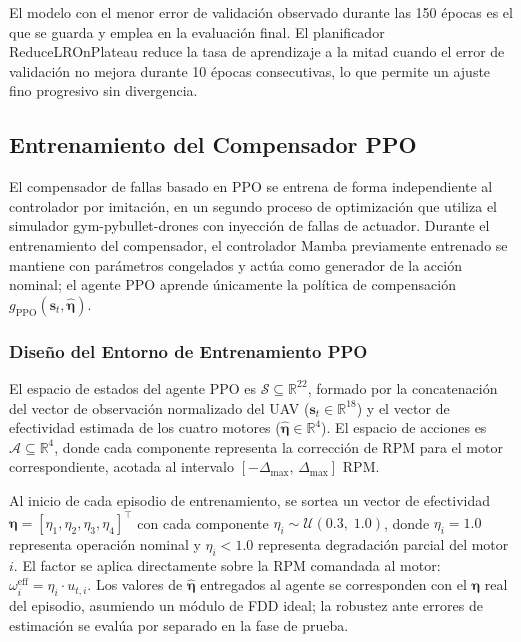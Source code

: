El modelo con el menor error de validación observado durante las 150 épocas es el que se guarda y emplea en la evaluación final. El planificador ReduceLROnPlateau reduce la tasa de aprendizaje a la mitad cuando el error de validación no mejora durante 10 épocas consecutivas, lo que permite un ajuste fino progresivo sin divergencia.


\subsection{Entrenamiento del Compensador PPO}
\label{sec:ppo_train}

El compensador de fallas basado en PPO se entrena de forma independiente al controlador por imitación, en un segundo proceso de optimización que utiliza el simulador gym-pybullet-drones con inyección de fallas de actuador. Durante el entrenamiento del compensador, el controlador Mamba previamente entrenado se mantiene con parámetros congelados y actúa como generador de la acción nominal; el agente PPO aprende únicamente la política de compensación $g_{\text{PPO}}(\mathbf{s}_t, \hat{\boldsymbol{\eta}})$.

\subsubsection{Diseño del Entorno de Entrenamiento PPO}

El espacio de estados del agente PPO es $\mathcal{S} \subseteq \mathbb{R}^{22}$, formado por la concatenación del vector de observación normalizado del UAV ($\mathbf{s}_t \in \mathbb{R}^{18}$) y el vector de efectividad estimada de los cuatro motores ($\hat{\boldsymbol{\eta}} \in \mathbb{R}^4$). El espacio de acciones es $\mathcal{A} \subseteq \mathbb{R}^4$, donde cada componente representa la corrección de RPM para el motor correspondiente, acotada al intervalo $[-\Delta_{\max},\, \Delta_{\max}]$ RPM.

Al inicio de cada episodio de entrenamiento, se sortea un vector de efectividad $\boldsymbol{\eta} = [\eta_1,\eta_2,\eta_3,\eta_4]^\top$ con cada componente $\eta_i \sim \mathcal{U}(0.3,\; 1.0)$, donde $\eta_i = 1.0$ representa operación nominal y $\eta_i < 1.0$ representa degradación parcial del motor $i$. El factor se aplica directamente sobre la RPM comandada al motor: $\omega_i^{\text{eff}} = \eta_i \cdot u_{t,i}$. Los valores de $\hat{\boldsymbol{\eta}}$ entregados al agente se corresponden con el $\boldsymbol{\eta}$ real del episodio, asumiendo un módulo de FDD ideal; la robustez ante errores de estimación se evalúa por separado en la fase de prueba.

